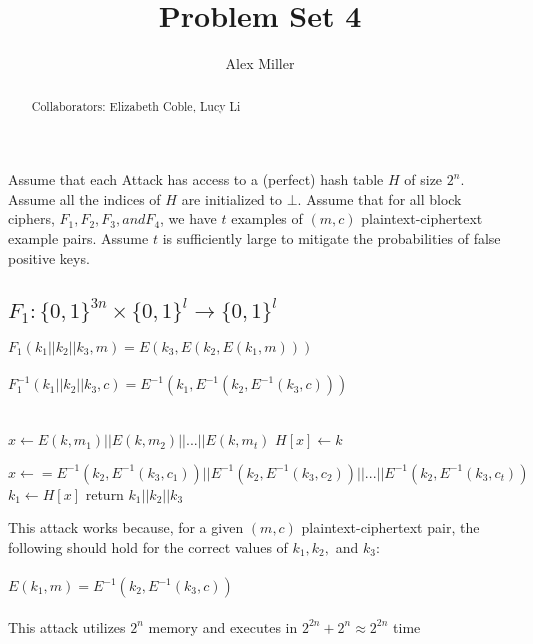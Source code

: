 \documentclass[]{article}
\title{Problem Set 4}
\author{Alex Miller}
\begin{document}
	
	\maketitle
	
\begin{abstract}
	Collaborators: Elizabeth Coble, Lucy Li
\end{abstract}



\section{}
Assume that each Attack has access to a (perfect) hash table $H$ of size $2^n$. Assume all the indices of $H$ are initialized to $\bot$. Assume that for all block ciphers, $F_1, F_2, F_3, and F_4$, we have $t$ examples of $(m, c)$ plaintext-ciphertext example pairs. Assume $t$ is sufficiently large to mitigate the probabilities of false positive keys. 
\subsection{$F_1: \{0,1\}^{3n}\times \{0,1\}^l \rightarrow \{0,1\}^l$}

$F_1(k_1 || k_2 || k_3, m) = E(k_3, E(k_2, E(k_1, m)))$
\\\\
$F_1^{-1}(k_1 || k_2 || k_3, c) = E^{-1}(k_1, E^{-1}(k_2, E^{-1}(k_3, c)))$
\\\\
\begin{algorithm}[H]
	\SetAlgoLined
	 {
		$x \leftarrow E(k, m_1) || E(k, m_2) || ... || E(k, m_t)$\;
		$H[x] \leftarrow k$\;
	}

	 {
		$x \leftarrow = E^{-1}(k_2, E^{-1}(k_3, c_1)) || E^{-1}(k_2, E^{-1}(k_3, c_2)) || ... || E^{-1}(k_2, E^{-1}(k_3, c_t))$\;
		 {
			$k_1 \leftarrow H[x]$\;
			return $k_1 || k_2 || k_3$\;
		}
	}
	\caption{$Attack((m_1,c_1),(m_2, c_2), ..., (m_t, c_t))$}
\end{algorithm}

This attack works because, for a given $(m, c)$ plaintext-ciphertext pair, the following should hold for the correct values of $k_1, k_2,$ and $k_3$:
\\\\
$E(k_1, m) = E^{-1}(k_2, E^{-1}(k_3, c))$
\\\\
This attack utilizes $2^n$ memory and executes in $2^{2n} + 2^n \approx 2^{2n}$ time
\end{document}
